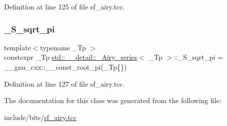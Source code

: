 Definition at line 125 of file sf\+\_\+airy.\+tcc.

\mbox{\label{classstd_1_1____detail_1_1__Airy__series_a3fd1fba37ef8beb0d89854d4e58b8a38}} 
\subsubsection{\texorpdfstring{\+\_\+\+S\+\_\+sqrt\+\_\+pi}{\_S\_sqrt\_pi}}
{\footnotesize\ttfamily template$<$typename \+\_\+\+Tp $>$ \\
constexpr \+\_\+\+Tp \hyperlink{classstd_1_1____detail_1_1__Airy__series}{std\+::\+\_\+\+\_\+detail\+::\+\_\+\+Airy\+\_\+series}$<$ \+\_\+\+Tp $>$\+::\+\_\+\+S\+\_\+sqrt\+\_\+pi = \+\_\+\+\_\+gnu\+\_\+cxx\+::\+\_\+\+\_\+const\+\_\+root\+\_\+pi(\+\_\+\+Tp\{\})\hspace{0.3cm}{\ttfamily [static]}}



Definition at line 127 of file sf\+\_\+airy.\+tcc.



The documentation for this class was generated from the following file\+:\begin{DoxyCompactItemize}
\item 
include/bits/\hyperlink{sf__airy_8tcc}{sf\+\_\+airy.\+tcc}\end{DoxyCompactItemize}
